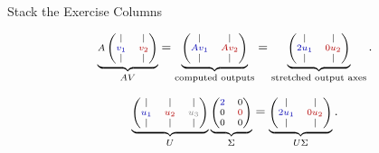 \documentclass[10pt]{beamer}
\theoremstyle{definition}
\newcommand{\rd}[1]{{\color{red!70!black}#1}}
\newcommand{\bl}[1]{{\color{blue!70!black}#1}}
\newcommand{\gry}[1]{{\color{gray}#1}}
\begin{document}
\begin{frame}[shrink=8]{Stack the Exercise Columns}

\[
\scriptsize
\underbrace{
A
\begin{pmatrix}
|&|\\
\bl{v_1}&\rd{v_2}\\
|&|
\end{pmatrix}}_{AV}
=
\underbrace{
\begin{pmatrix}
|&|\\
\bl{Av_1}&\rd{Av_2}\\
|&|
\end{pmatrix}}_{\text{computed outputs}}
=
\underbrace{
\begin{pmatrix}
|&|\\
\bl{2u_1}&\rd{0u_2}\\
|&|
\end{pmatrix}}_{\text{stretched output axes}}.
\]

\vfill

\[
\scriptsize
\underbrace{
\begin{pmatrix}
|&|&|\\
\bl{u_1}&\rd{u_2}&\gry{u_3}\\
|&|&|
\end{pmatrix}}_{U}
\underbrace{
\begin{pmatrix}
\bl{2}&0\\
0&\rd{0}\\
0&0
\end{pmatrix}}_{\Sigma}
=
\underbrace{
\begin{pmatrix}
|&|\\
\bl{2u_1}&\rd{0u_2}\\
|&|
\end{pmatrix}}_{U\Sigma}.
\]

\end{frame}
\end{document}
